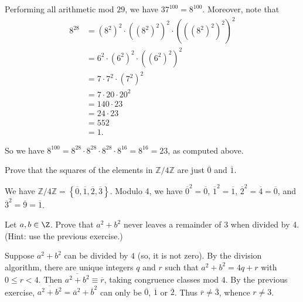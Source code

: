 \begin{questions}
\begin{solution}
    Performing all arithmetic mod \(29\), we have \(37^{100}=8^{100}\). Moreover, note that
\[
\begin{aligned}
8^{28} & =\left(8^2\right)^2 \cdot\left(\left(8^2\right)^2\right)^2 \cdot\left(\left(\left(8^2\right)^2\right)^2\right)^2 \\
& =6^2 \cdot\left(6^2\right)^2 \cdot\left(\left(6^2\right)^2\right)^2 \\
& =7 \cdot 7^2 \cdot\left(7^2\right)^2 \\
& =7 \cdot 20 \cdot 20^2 \\
& =140 \cdot 23 \\
& =24 \cdot 23 \\
& =552 \\
& =1 .
\end{aligned}
\]

So we have \(8^{100}=8^{28} \cdot 8^{28} \cdot 8^{28} \cdot 8^{16}=8^{16}=23\), as computed above.
\end{solution}

\question
    Prove that the squares of the elements in \(\mathbb{Z} / 4 \mathbb{Z}\) are just \(\overline{0}\) and \(\overline{1}\).
\begin{theproof}
    We have \(\mathbb{Z} / 4 \mathbb{Z} =\left\{ \overline{0},\overline{1},\overline{2},\overline{3} \right\}  \). 
    Modulo 4, we have \(\overline{0}^2 = \overline{0}\), \(\overline{1}^2 = \overline{1}\), \(\overline{2}^2 = \overline{4} = \overline{0}\), and \(\overline{3}^2 = \overline{9} = \overline{1}\).
\end{theproof}

\question
    Let \(a,b\in \Z\).
    Prove  that \(a^2+b^2\) never leaves a remainder of 3 when divided by 4. (Hint: use the previous exercise.)
\begin{theproof}
    Suppose \(a^2+b^2\) can be divided by \(4\) (so, it is not zero). 
    By the division algorithm, there are unique integers \(q\) and \(r\) such that \(a^2+b^2 = 4q +r\) with \(0\leq r < 4\). Then \(\overline{a^2+b^2} \equiv \overline{r}\), taking congruence classes mod \(4\). By the previous exercise, \(\overline{a^2+b^2}=\overline{a}^2 + \overline{b}^2\) can only be \(\overline{0}\), \(\overline{1}\) or \(\overline{2}\). Thus \(\overline{r}\neq \overline{3}\), whence \(r\neq 3\). 
\end{theproof}



\end{questions}

